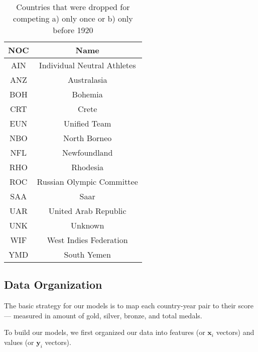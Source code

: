 \documentclass[12pt]{article}
\begin{document}
\begin{table}[h]
\centering
	\begin{tabular}{|c|c|}
		\hline
		NOC & Name\\
		\hline
		\hline
		AIN & Individual Neutral Athletes\\\hline
		ANZ & Australasia\\\hline
		BOH & Bohemia \\\hline
		CRT & Crete\\\hline
		EUN & Unified Team\\\hline
		NBO & North Borneo\\\hline
		NFL & Newfoundland\\\hline
		RHO & Rhodesia\\\hline
		ROC & Russian Olympic Committee\\\hline
		SAA & Saar\\\hline
		UAR & United Arab Republic \\\hline
		UNK & Unknown\\\hline
		WIF & West Indies Federation\\\hline
		YMD & South Yemen\\\hline
	\end{tabular}
	\caption{Countries that were dropped for competing a) only once or b) only before 1920}

\end{table}



\subsection{Data Organization}
The basic strategy for our models is to map each country-year pair to their score — measured in amount of gold, silver, bronze, and total medals.


To build our models, we first organized our data into features (or $\bm{x}_i$ vectors) and values (or $\bm{y}_i$ vectors).
\end{document}
